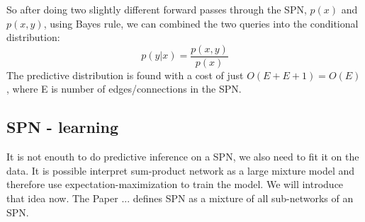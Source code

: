 So after doing two slightly different forward passes through the SPN, 
$p(x)$ and $p(x,y)$, using Bayes rule,
we can combined the two queries into the conditional distribution: 
$$p(y|x) = \frac{p(x,y)}{p(x)}$$
The predictive distribution is found with a cost of just $O(E+E+1) = O(E)$, where E is number
of edges/connections in the SPN. 

\subsection{SPN - learning}
It is not enouth to do predictive inference on a SPN, we also need to fit it on
the data. It is possible interpret sum-product network as a large mixture model 
and therefore use expectation-maximization to train the model. 
We will introduce that idea now. The Paper \cite{SPN_EM}... %
defines SPN as a mixture of all sub-networks of an SPN.

